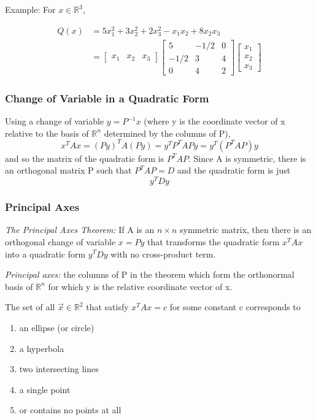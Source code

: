 \documentclass[12pt]{article} %
\newcommand{\R}{\mathbb{R}}
\begin{document}
Example:
For $x \in \R^3$, 

\begin{align*}
	Q(x) &= 5x_1^2 + 3x_2^2 + 2x_3^2 - x_1 x_2 + 8x_2 x_3\\
	&= \begin{bmatrix}
		x_1 & x_2 & x_3
	\end{bmatrix} \begin{bmatrix}
		5 & -1/2 & 0\\
		-1/2 & 3 & 4\\
		0 & 4 & 2
	\end{bmatrix} \begin{bmatrix}
		x_1\\
		x_2\\
		x_3
	\end{bmatrix}
\end{align*}

\subsubsection{Change of Variable in a Quadratic Form}
Using a change of variable $y = P^{-1} x$ (where y is the coordinate vector of x relative to the basis of $\R^n$ determined by the columns of P),
$$x^T A x = (Py)^T A (Py) = y^T P^T A P y = y^T (P^T A P)y$$
and so the matrix of the quadratic form is $P^T AP$. 
Since A is symmetric, there is an orthogonal matrix P such that $P^T AP = D$ and the quadratic form is just 
$$y^T D y$$

\subsubsection{Principal Axes}
\emph{The Principal Axes Theorem:} If A is an $n \times n$ symmetric matrix, then there is an orthogonal change of variable $x = Py$ that transforms the quadratic form $x^TAx$ into a quadratic form $y^T D y$ with no cross-product term. 

\emph{Principal axes:} the columns of P in the theorem which form the orthonormal basis of $\R^n$ for which y is the relative coordinate vector of x.

The set of all $\vec{x} \in \R^2$ that satisfy $x^T A x = c$ for some constant c corresponds to 
\begin{enumerate}
	\item an ellipse (or circle)
	\item a hyperbola
	\item two intersecting lines
	\item a single point
	\item or contains no points at all
\end{enumerate}
\end{document}
